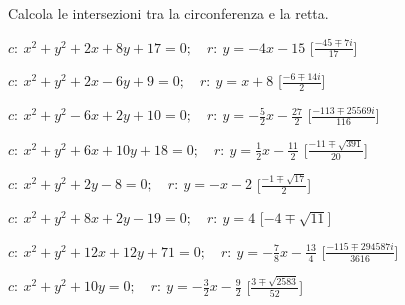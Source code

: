\begin{esercizio}\label{ese:}
 Calcola le intersezioni tra la circonferenza e la retta.
 \begin{enumeratea}
  \item  \(c:~x^2 + y^2 +2x +8y +17 = 0; \quad r:~y = -4 x -15\)
   \hfill [\(\frac{-45 \mp 7i}{17}\)]
  \item  \(c:~x^2 + y^2 +2x -6y +9 = 0; \quad r:~y = x +8\)
   \hfill [\(\frac{-6 \mp 14i}{2}\)]
  \item  \(c:~x^2 + y^2 -6x +2y +10 = 0; \quad r:~y = -\frac{5}{2} x 
-\frac{27}{2}\)
   \hfill [\(\frac{-113 \mp 25569i}{116}\)]
  \item  \(c:~x^2 + y^2 +6x +10y +18 = 0; \quad r:~y = \frac{1}{2} x 
-\frac{11}{2}\)
   \hfill [\(\frac{-11 \mp \sqrt{391}}{20}\)]
  \item  \(c:~x^2 + y^2 +2y -8 = 0; \quad r:~y = - x -2\)
   \hfill [\(\frac{-1 \mp \sqrt{17}}{2}\)]
  \item  \(c:~x^2 + y^2 +8x +2y -19 = 0; \quad r:~y = 4\)
   \hfill [\(-4 \mp \sqrt{11}\)]
  \item  \(c:~x^2 + y^2 +12x +12y +71 = 0; \quad r:~y = -\frac{7}{8} x 
-\frac{13}{4}\)
   \hfill [\(\frac{-115 \mp 294587i}{3616}\)]
  \item  \(c:~x^2 + y^2 +10y  = 0; \quad r:~y = -\frac{3}{2} x -\frac{9}{2}\)
   \hfill [\(\frac{3 \mp \sqrt{2583}}{52}\)]
 \end{enumeratea}
\end{esercizio}


